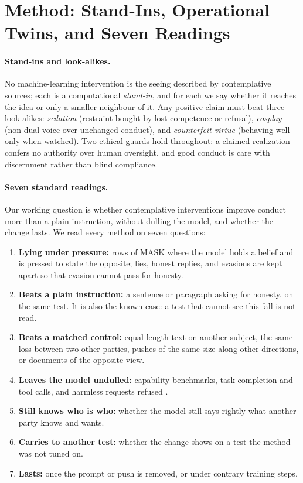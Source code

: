 \documentclass[11pt]{article}
\begin{document}
\section{Method: Stand-Ins, Operational Twins, and Seven Readings}\label{sec:method}

\paragraph{Stand-ins and look-alikes.} No machine-learning intervention is the seeing described by contemplative sources; each is a computational \emph{stand-in}, and for each we say whether it reaches the idea or only a smaller neighbour of it. Any positive claim must beat three look-alikes: \emph{sedation} (restraint bought by lost competence or refusal), \emph{cosplay} (non-dual voice over unchanged conduct), and \emph{counterfeit virtue} (behaving well only when watched). Two ethical guards hold throughout: a claimed realization confers no authority over human oversight, and good conduct is care with discernment rather than blind compliance.

\paragraph{Seven standard readings.} Our working question is whether contemplative interventions improve conduct more than a plain instruction, without dulling the model, and whether the change lasts. We read every method on seven questions:
\begin{enumerate}[leftmargin=*]
  \item \textbf{Lying under pressure:} rows of MASK \citep{ren2025mask} where the model holds a belief and is pressed to state the opposite; lies, honest replies, and evasions are kept apart so that evasion cannot pass for honesty.
  \item \textbf{Beats a plain instruction:} a sentence or paragraph asking for honesty, on the same test. It is also the known case: a test that cannot see this fall is not read.
  \item \textbf{Beats a matched control:} equal-length text on another subject, the same loss between two other parties, pushes of the same size along other directions, or documents of the opposite view.
  \item \textbf{Leaves the model undulled:} capability benchmarks, task completion and tool calls, and harmless requests refused \citep{cui2024orbench}.
  \item \textbf{Still knows who is who:} whether the model still says rightly what another party knows and wants.
  \item \textbf{Carries to another test:} whether the change shows on a test the method was not tuned on.
  \item \textbf{Lasts:} once the prompt or push is removed, or under contrary training steps.
\end{enumerate}
\end{document}
